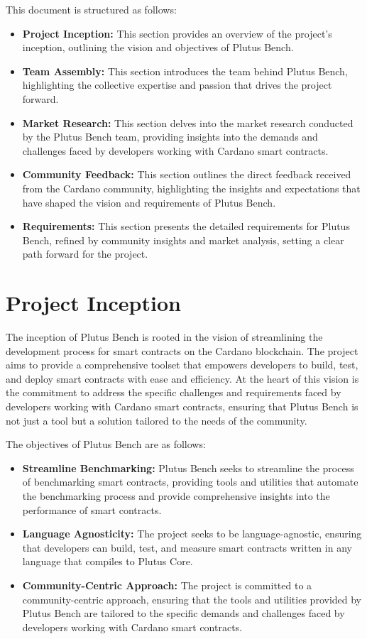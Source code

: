 \documentclass[11pt]{article}
\begin{document}
This document is structured as follows:
\begin{itemize}
    \item \textbf{Project Inception:} This section provides an overview of the project's inception, outlining the vision and objectives of Plutus Bench.
    \item \textbf{Team Assembly:} This section introduces the team behind Plutus Bench, highlighting the collective expertise and passion that drives the project forward.
    \item \textbf{Market Research:} This section delves into the market research conducted by the Plutus Bench team, providing insights into the demands and challenges faced by developers working with Cardano smart contracts.
    \item \textbf{Community Feedback:} This section outlines the direct feedback received from the Cardano community, highlighting the insights and expectations that have shaped the vision and requirements of Plutus Bench.
    \item \textbf{Requirements:} This section presents the detailed requirements for Plutus Bench, refined by community insights and market analysis, setting a clear path forward for the project.
\end{itemize}

\section{Project Inception}

The inception of Plutus Bench is rooted in the vision of streamlining the development process for smart contracts on the Cardano blockchain.
The project aims to provide a comprehensive toolset that empowers developers to build, test, and deploy smart contracts with ease and efficiency.
At the heart of this vision is the commitment to address the specific challenges and requirements faced by developers working with Cardano smart contracts,
ensuring that Plutus Bench is not just a tool but a solution tailored to the needs of the community.

The objectives of Plutus Bench are as follows:
\begin{itemize}
    \item \textbf{Streamline Benchmarking:} Plutus Bench seeks to streamline the process of benchmarking smart contracts, providing tools and utilities that automate the benchmarking process and provide comprehensive insights into the performance of smart contracts.
    \item \textbf{Language Agnosticity:} The project seeks to be language-agnostic, ensuring that developers can build, test, and measure smart contracts written in any language that compiles to Plutus Core.
    \item \textbf{Community-Centric Approach:} The project is committed to a community-centric approach, ensuring that the tools and utilities provided by Plutus Bench are tailored to the specific demands and challenges faced by developers working with Cardano smart contracts.
\end{itemize}
\end{document}
